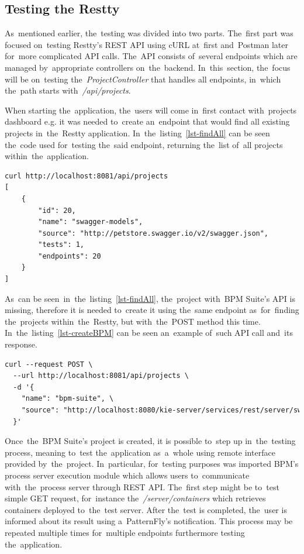 \subsection{Testing the Restty}
As~mentioned earlier, the~testing was divided into two parts. The~first part was focused on~testing Restty's REST API using
cURL at~first and~Postman later for~more complicated API calls. The~API consists of~several endpoints which are managed
by~appropriate controllers on~the~backend. In~this~section, the~focus will be on~testing the~\textit{ProjectController}
that handles all endpoints, in~which the~path starts with~\textit{/api/projects}.

When starting the~application, the~users will come in~first contact with~projects dashboard e.g. it was needed to~create an~endpoint
that would find all existing projects in~the~Restty application. In~the~listing~\ref{lst-findAll} can be seen the~code used for~testing
the~said endpoint, returning the~list of~all projects within~the~application. 

\vspace{1mm}
\begin{lstlisting}[caption=Testing the~\textit{/api/projects} endpoint using cURL.,
style=dp-default,label=lst-findAll]
curl http://localhost:8081/api/projects
[
	{
		"id": 20,
		"name": "swagger-models",
		"source": "http://petstore.swagger.io/v2/swagger.json",
		"tests": 1,
		"endpoints": 20
	}
]
\end{lstlisting}

As~can be seen~in~the~listing~\ref{lst-findAll}, the~project with~BPM Suite's API is missing, therefore it is needed to~create it using
the~same endpoint as~for~finding the~projects within~the~Restty, but with~the~POST method this time. In~the~listing~\ref{lst-createBPM}
can be seen an~example of~such API call and~its response.

\vspace{1mm}
\begin{lstlisting}[caption=Testing the~creating of~an~project within~the~Restty.,
label=lst-createBPM, style=dp-default, language=XML]
curl --request POST \
  --url http://localhost:8081/api/projects \
  -d '{
  	"name": "bpm-suite", \ 
  	"source": "http://localhost:8080/kie-server/services/rest/server/swagger.json" \
  }'
\end{lstlisting}

Once~the~BPM Suite's project is created, it is possible to~step up in~the~testing process, meaning to~test the~application as~a~whole using
remote interface provided by~the~project. In~particular, for~testing purposes was imported BPM's process server execution module which allows
users to~communicate with~the~process server through REST API. The~first step might be to~test simple GET request, for~instance
the~\textit{/server/containers} which retrieves containers deployed to~the~test server. After the~test is completed, the~user is informed about
its result using a~PatternFly's notification. This process may be repeated multiple times for~multiple endpoints furthermore testing the~application.

